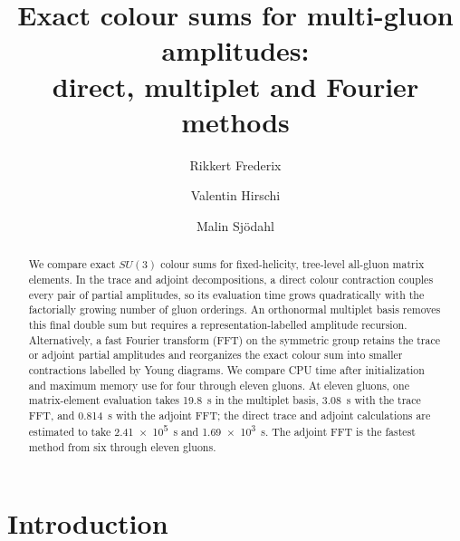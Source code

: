 \documentclass[aps,prd,twocolumn,superscriptaddress,nofootinbib]{revtex4-2}
\begin{document}
\title{Exact colour sums for multi-gluon amplitudes:\texorpdfstring{\\}{ }
direct, multiplet and Fourier methods}

\author{Rikkert Frederix}
\author{Valentin Hirschi}
\author{Malin Sj\"odahl}

\begin{abstract}
We compare exact $SU(3)$ colour sums for fixed-helicity, tree-level all-gluon
matrix elements.  In the trace and adjoint decompositions, a direct colour
contraction couples every pair of partial amplitudes, so its evaluation time
grows quadratically with the factorially growing number of gluon orderings.  An
orthonormal multiplet basis removes this final double sum but requires a
representation-labelled amplitude recursion.  Alternatively, a fast Fourier
transform (FFT) on the symmetric group retains the trace or adjoint partial
amplitudes and reorganizes the exact colour sum into smaller contractions
labelled by Young diagrams.
We compare CPU time after initialization and maximum memory use for four
through eleven gluons.  At eleven gluons, one matrix-element evaluation takes
\SI{19.8}{s} in the multiplet basis, \SI{3.08}{s} with the trace FFT, and
\SI{0.814}{s} with the adjoint FFT; the direct trace and adjoint calculations
are estimated to take \SI{2.41e5}{s} and \SI{1.69e3}{s}.  The adjoint FFT is
the fastest method from six through eleven gluons.
\end{abstract}

\maketitle

\section{Introduction}
\label{sec:intro}
\end{document}
